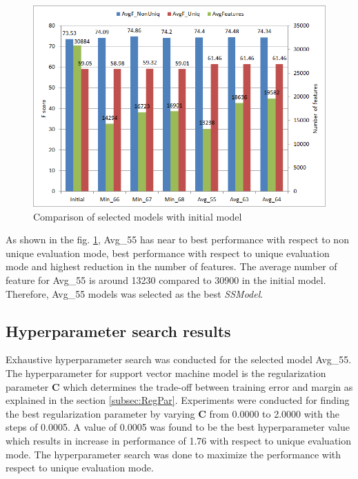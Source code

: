 \begin{figure}
\centering
\includegraphics[scale=0.6]{figures/6ModelsComparison.png}
\caption{Comparison of selected models with initial model}\label{fig:6ModelsComp}
\end{figure}

As shown in the fig. \ref{fig:6ModelsComp}, Avg\_55 has near to best performance with respect to non unique evaluation mode, best performance with respect to unique evaluation mode and highest reduction in the number of features. The average number of feature for Avg\_55 is around 13230 compared to 30900 in the initial model. Therefore, Avg\_55 models was selected as the best \textit{SSModel}.


\subsection{Hyperparameter search results}

Exhaustive hyperparameter search was conducted for the selected model Avg\_55. The hyperparameter for support vector machine model is the regularization parameter $\mathbf{C}$ which determines the trade-off between training error and margin as explained in the section \ref{subsec:RegPar}. Experiments were conducted for finding the best regularization parameter by varying $\mathbf{C}$ from 0.0000 to 2.0000 with the steps of 0.0005. A value of 0.0005 was found to be the best hyperparameter value which results in increase in performance of 1.76 with respect to unique evaluation mode. The hyperparameter search was done to  maximize the performance with respect to unique evaluation mode.


